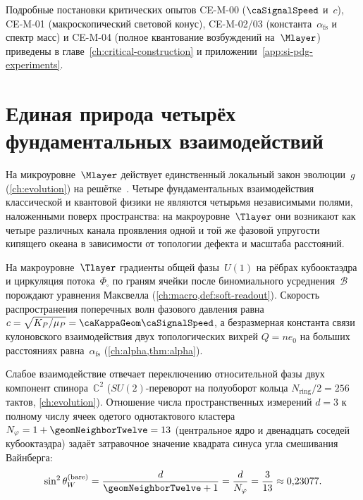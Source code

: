 \noindent
Подробные постановки критических опытов CE-M-00 ($\caSignalSpeed$ и~$c$), CE-M-01 (макроскопический световой конус), CE-M-02/03 (константа~$\alpha_{\mathrm{fs}}$ и спектр масс) и CE-M-04 (полное квантование возбуждений на~$\Mlayer$) приведены в главе~\ref{ch:critical-construction} и приложении~\ref{app:si-pdg-experiments}.

\section{Единая природа четырёх фундаментальных взаимодействий}
\label{sec:four-forces-map}

На микроуровне~$\Mlayer$ действует единственный локальный закон эволюции~$g$ (\cref{ch:evolution}) на решётке~\latGCKshort.
Четыре фундаментальных взаимодействия классической и квантовой физики не являются четырьмя независимыми полями, наложенными поверх пространства:
на макроуровне~$\Tlayer$ они возникают как четыре различных канала проявления одной и той же фазовой упругости кипящего океана в зависимости от топологии дефекта и масштаба расстояний.

\begin{proposition}
\label{prop:channel-em}
На макроуровне~$\Tlayer$ градиенты общей фазы~$U(1)$ на рёбрах кубооктаэдра и циркуляция потока~$\Phi_\square$ по граням ячейки после биномиального усреднения~$\mathcal{B}$ порождают уравнения Максвелла (\cref{ch:macro,def:soft-readout}).
Скорость распространения поперечных волн фазового давления равна $c = \sqrt{K_P/\mu_P} = \caKappaGeom\caSignalSpeed$,
а безразмерная константа связи кулоновского взаимодействия двух топологических вихрей $Q = n e_0$ на больших расстояниях равна~$\alpha_{\mathrm{fs}}$ (\cref{ch:alpha,thm:alpha}).
\end{proposition}

\begin{proposition}
\label{prop:weinberg-bare}
Слабое взаимодействие отвечает переключению относительной фазы двух компонент спинора~$\mathbb{C}^2$ ($SU(2)$-переворот на полуоборот кольца $N_{\mathrm{ring}}/2 = 256$ тактов, \cref{ch:evolution}).
Отношение числа пространственных измерений $d=3$ к полному числу ячеек одетого однотактового кластера $N_\varphi = 1 + \geomNeighborTwelve = 13$ (центральное ядро и двенадцать соседей кубооктаэдра) задаёт затравочное значение квадрата синуса угла смешивания Вайнберга:
\begin{equation}
\label{eq:sin2-bare}
  \sin^2\theta_W^{(\mathrm{bare})}
  = \frac{d}{\geomNeighborTwelve + 1}
  = \frac{d}{N_\varphi}
  = \frac{3}{13} \approx 0{,}23077.
\end{equation}
\end{proposition}

